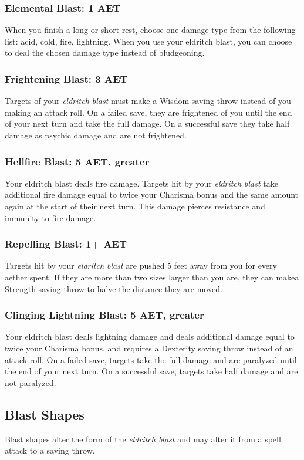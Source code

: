 \subsubsection{Elemental Blast: 1 AET}
When you finish a long or short rest, choose one damage type from the following list: acid, cold, fire, lightning. When you use your eldritch blast, you can choose to deal the chosen damage type instead of bludgeoning.

\subsubsection{Frightening Blast: 3 AET}
Targets of your \textit{eldritch blast} must make a Wisdom saving throw instead of you making an attack roll. On a failed save, they are frightened of you until the end of your next turn and take the full damage. On a successful save they take half damage as psychic damage and are not frightened.

\subsubsection{Hellfire Blast: 5 AET, greater}
Your eldritch blast deals fire damage. Targets hit by your \textit{eldritch blast} take additional fire damage equal to twice your Charisma bonus and the same amount again at the start of their next turn. This damage pierces resistance and immunity to fire damage.

\subsubsection{Repelling Blast: 1+ AET}
Targets hit by your \textit{eldritch blast} are pushed 5 feet away from you for every aether spent. If they are more than two sizes larger than you are, they can makea Strength saving throw to halve the distance they are moved.

\subsubsection{Clinging Lightning Blast: 5 AET, greater}
Your eldritch blast deals lightning damage and deals additional damage equal to twice your Charisma bonus, and requires a Dexterity saving throw instead of an attack roll. On a failed save, targets take the full damage and are paralyzed until the end of your next turn. On a successful save, targets take half damage and are not paralyzed.

\subsection{Blast Shapes}
Blast shapes alter the form of the \textit{eldritch blast} and may alter it from a spell attack to a saving throw.

